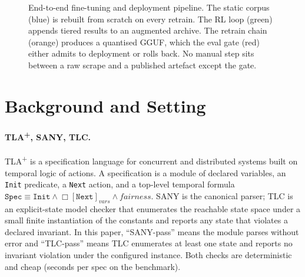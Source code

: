 \documentclass[11pt]{article}
\begin{document}
\begin{figure}[t]
\caption{End-to-end fine-tuning and deployment pipeline.  The static
corpus (blue) is rebuilt from scratch on every retrain.  The RL loop
(green) appends tiered results to an augmented archive.  The retrain
chain (orange) produces a quantised GGUF, which the eval gate (red)
either admits to deployment or rolls back.  No manual step sits between
a raw scrape and a published artefact except the gate.}
\label{fig:pipeline}
\end{figure}

\section{Background and Setting}
\label{sec:bg}

\paragraph{TLA\textsuperscript{+}, SANY, TLC.}
TLA\textsuperscript{+} is a specification language for concurrent and
distributed systems built on temporal logic of actions.  A specification
is a module of declared variables, an \texttt{Init} predicate, a
\texttt{Next} action, and a top-level temporal formula
$\texttt{Spec}\equiv\texttt{Init}\wedge\Box[\texttt{Next}]_{vars}
\wedge\textit{fairness}$.
SANY is the canonical parser; TLC is an explicit-state model checker
that enumerates the reachable state space under a small finite
instantiation of the constants and reports any state that violates a
declared invariant.  In this paper, ``SANY-pass'' means the module
parses without error and ``TLC-pass'' means TLC enumerates at least one
state and reports no invariant violation under the configured instance.
Both checks are deterministic and cheap (seconds per spec on the
benchmark).
\end{document}
